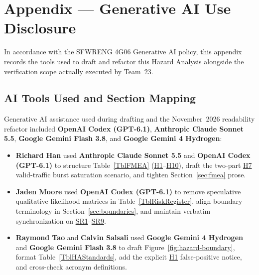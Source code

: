 \documentclass[11pt]{article}
\begin{document}
\section{Appendix --- Generative AI Use Disclosure}\label{sec:ha-genai}

In accordance with the SFWRENG 4G06 Generative AI policy, this appendix records the tools used to draft and refactor this Hazard Analysis alongside the verification scope actually executed by Team~23.

\subsection{AI Tools Used and Section Mapping}
Generative AI assistance used during drafting and the November~2026 readability refactor included \textbf{OpenAI Codex (GPT-6.1)}, \textbf{Anthropic Claude Sonnet 5.5}, \textbf{Google Gemini Flash 3.8}, and \textbf{Google Gemini 4 Hydrogen}:
\begin{itemize}[leftmargin=*, noitemsep]
    \item \textbf{Richard Han} used \textbf{Anthropic Claude Sonnet 5.5} and \textbf{OpenAI Codex (GPT-6.1)} to structure Table~\ref{TblFMEA} (\hyperref[haz:H1]{H1}--\hyperref[haz:H10]{H10}), draft the two-part \hyperref[haz:H7]{H7} valid-traffic burst saturation scenario, and tighten Section~\ref{sec:fmea} prose.
    \item \textbf{Jaden Moore} used \textbf{OpenAI Codex (GPT-6.1)} to remove speculative qualitative likelihood matrices in Table~\ref{TblRiskRegister}, align boundary terminology in Section~\ref{sec:boundaries}, and maintain verbatim synchronization on \hyperref[SR1]{SR1}--\hyperref[SR9]{SR9}.
    \item \textbf{Raymond Tao} and \textbf{Calvin Salsali} used \textbf{Google Gemini 4 Hydrogen} and \textbf{Google Gemini Flash 3.8} to draft Figure~\ref{fig:hazard-boundary}, format Table~\ref{TblHAStandards}, add the explicit \hyperref[haz:H1]{H1} false-positive notice, and cross-check acronym definitions.
\end{itemize}
\end{document}
